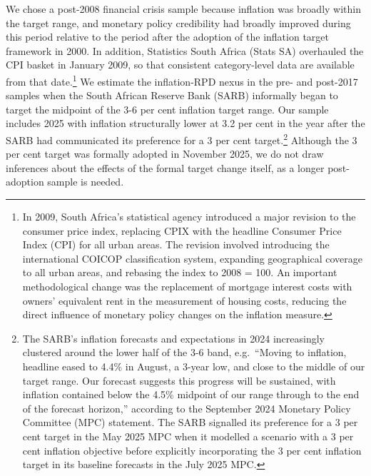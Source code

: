 \documentclass[
  letterpaper,
  DIV=11,
  numbers=noendperiod]{scrartcl}
\begin{document}
We chose a post-2008 financial crisis sample because inflation was
broadly within the target range, and monetary policy credibility had
broadly improved during this period relative to the period after the
adoption of the inflation target framework in 2000. In addition,
Statistics South Africa (Stats SA) overhauled the CPI basket in January
2009, so that consistent category-level data are available from that
date.\footnote{In 2009, South Africa's statistical agency introduced a
  major revision to the consumer price index, replacing CPIX with the
  headline Consumer Price Index (CPI) for all urban areas. The revision
  involved introducing the international COICOP classification system,
  expanding geographical coverage to all urban areas, and rebasing the
  index to 2008 = 100. An important methodological change was the
  replacement of mortgage interest costs with owners' equivalent rent in
  the measurement of housing costs, reducing the direct influence of
  monetary policy changes on the inflation measure.} We estimate the
inflation-RPD nexus in the pre- and post-2017 samples when the South
African Reserve Bank (SARB) informally began to target the midpoint of
the 3-6 per cent inflation target range. Our sample includes 2025 with
inflation structurally lower at 3.2 per cent in the year after the SARB
had communicated its preference for a 3 per cent target.\footnote{The
  SARB's inflation forecasts and expectations in 2024 increasingly
  clustered around the lower half of the 3-6 band, e.g.~``Moving to
  inflation, headline eased to 4.4\% in August, a 3-year low, and close
  to the middle of our target range. Our forecast suggests this progress
  will be sustained, with inflation contained below the 4.5\% midpoint
  of our range through to the end of the forecast horizon,'' according
  to the September 2024 Monetary Policy Committee (MPC) statement. The
  SARB signalled its preference for a 3 per cent target in the May 2025
  MPC when it modelled a scenario with a 3 per cent inflation objective
  before explicitly incorporating the 3 per cent inflation target in its
  baseline forecasts in the July 2025 MPC.} Although the 3 per cent
target was formally adopted in November 2025, we do not draw inferences
about the effects of the formal target change itself, as a longer
post-adoption sample is needed.
\end{document}
